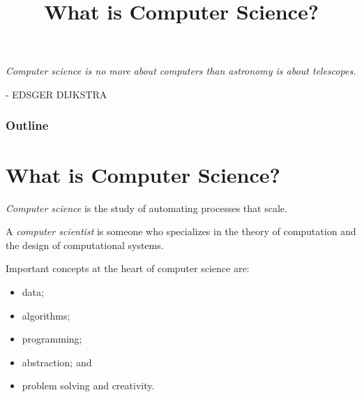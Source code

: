 \documentclass[8pt,a4paper,compress,handout]{beamer}
\title{What is Computer Science?}
\date{}
\begin{document}
\begin{frame}
\hfill
\begin{minipage}{150pt}
\begin{flushright}
\tiny \emph{Computer science is no more about computers than astronomy is about telescopes.} 

\smallskip

- EDSGER DIJKSTRA
\end{flushright}
\end{minipage}
\vfill
\titlepage
\end{frame}

\begin{frame}
\frametitle{Outline}
\tableofcontents
\end{frame}

\section{What is Computer Science?}
\begin{frame}[fragile]
\emph{Computer science} is the study of automating processes that scale. 

\bigskip

A \emph{computer scientist} is someone who specializes in the theory of computation and the design of computational systems.

\bigskip

Important concepts at the heart of computer science are: 
\begin{itemize}
\item data;  
\item algorithms; 
\item programming; 
\item abstraction; and 
\item problem solving and creativity.
\end{itemize}
\end{frame}
\end{document}
